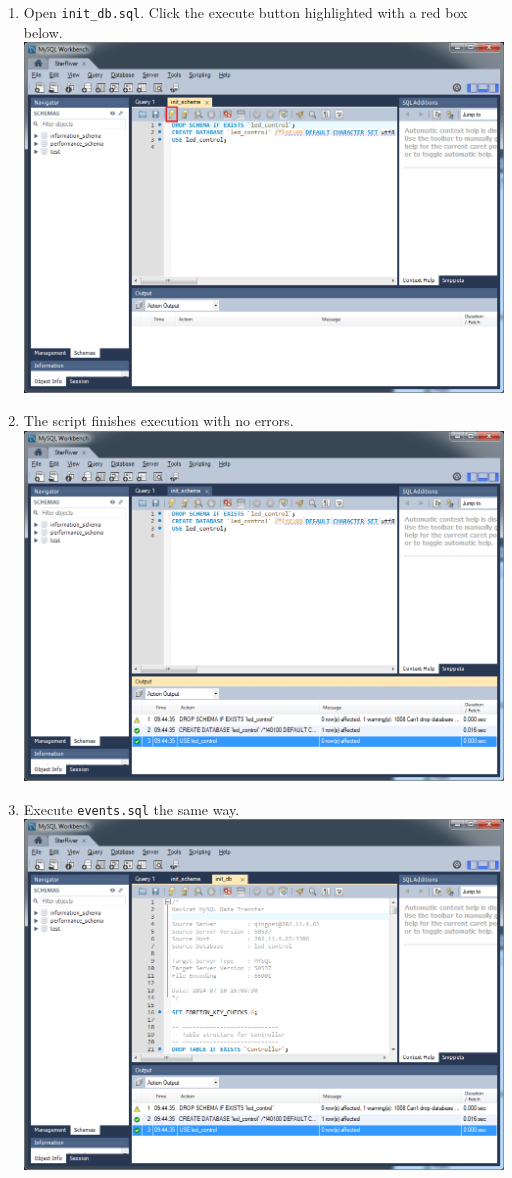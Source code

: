 \begin{enumerate}
\item
  Open \texttt{init\_db.sql}. Click the execute button highlighted with
  a red box below. \includegraphics{img/db_init_7.png}
\item
  The script finishes execution with no errors.
  \includegraphics{img/db_init_8.png}
\item
  Execute \texttt{events.sql} the same way.
  \includegraphics{img/db_init_9.png}

\end{enumerate}
